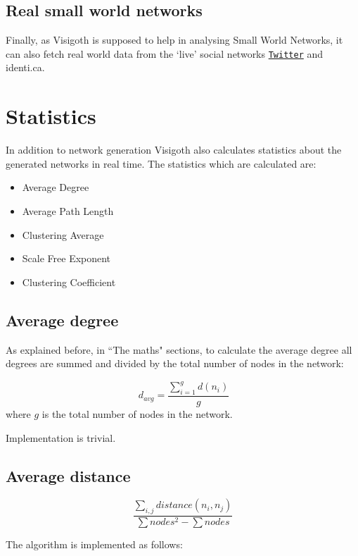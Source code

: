 \documentclass[a4paper,11pt,titlepage]{article}
\let\stdhref\href
\renewcommand{\href}[2]{\stdhref{#1}{\texttt{#2}}}
\let\stdsection\section         %
\renewcommand{\section}{\newpage\stdsection}
\newcommand{\Twitter}{\href{http://twitter.com}{Twitter} }
\begin{document}
\subsection{Real small world networks}
Finally, as Visigoth is supposed to help in analysing Small World
Networks, it can also fetch real world data from the `live' social
networks \Twitter and identi.ca.



\section{Statistics}
In addition to network generation Visigoth also calculates statistics about the
generated networks in real time. The statistics which are calculated are:

\begin{itemize}
  \item Average Degree
  \item Average Path Length
  \item Clustering Average
  \item Scale Free Exponent
  \item Clustering Coefficient
\end{itemize}


\subsection{Average degree}

As explained before, in ``The maths" sections, to calculate the
average degree all degrees are summed and divided by the total number
of nodes in the network:

\begin{equation}
\ d_{avg} =\frac{\sum_{i=1}^gd(n_i)}{g}
\end{equation}
where \(g\) is the total number of nodes in the network.

Implementation is trivial.


\subsection{Average distance}
\[ \frac{\sum_{i,j}distance(n_i,n_j)}
        {\sum nodes^2 - \sum nodes}
\]

The algorithm is implemented as follows:
\end{document}
